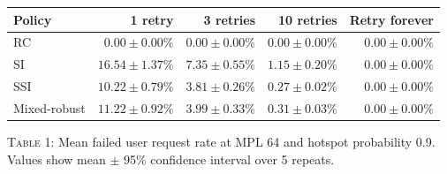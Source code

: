\documentclass[border=12pt]{standalone}
\begin{document}
\begin{tabular}{lrrrr}
\toprule
Policy & 1 retry & 3 retries & 10 retries & Retry forever \\
\midrule
RC & $0.00 \pm 0.00\%$ & $0.00 \pm 0.00\%$ & $0.00 \pm 0.00\%$ & $0.00 \pm 0.00\%$ \\
SI & $16.54 \pm 1.37\%$ & $7.35 \pm 0.55\%$ & $1.15 \pm 0.20\%$ & $0.00 \pm 0.00\%$ \\
SSI & $10.22 \pm 0.79\%$ & $3.81 \pm 0.26\%$ & $0.27 \pm 0.02\%$ & $0.00 \pm 0.00\%$ \\
Mixed-robust & $11.22 \pm 0.92\%$ & $3.99 \pm 0.33\%$ & $0.31 \pm 0.03\%$ & $0.00 \pm 0.00\%$ \\
\bottomrule
\end{tabular}

\vspace{6pt}
{\small \textsc{Table 1:} Mean failed user request rate at MPL 64 and hotspot probability 0.9. Values show mean $\pm$ 95\% confidence interval over 5 repeats.}
\end{document}
